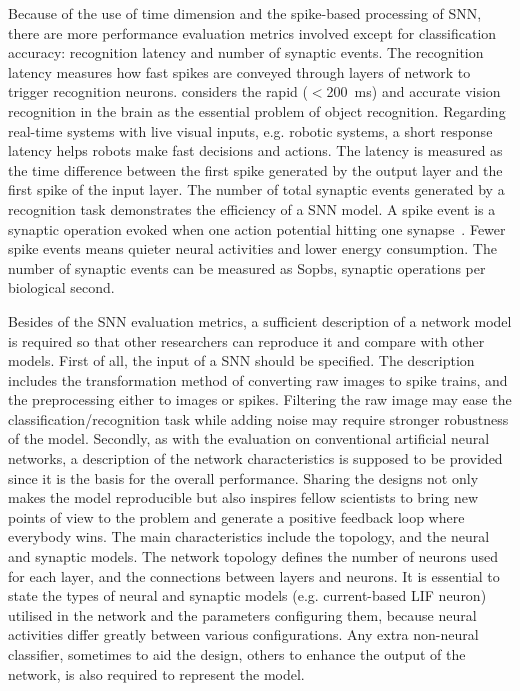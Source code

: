 \documentclass{frontiersENG} %
\begin{document}
Because of the use of time dimension and the spike-based processing of SNN, there are more performance evaluation metrics involved except for classification accuracy: recognition latency and number of synaptic events.
The recognition latency measures how fast spikes are conveyed through layers of network to trigger recognition neurons.
\cite{dicarlo2012does} considers the rapid ($<$200~ms) and accurate vision recognition in the brain as the essential problem of object recognition.
Regarding real-time systems with live visual inputs, e.g. robotic systems, a short response latency helps robots make fast decisions and actions.
The latency is measured as the time difference between the first spike generated by the output layer and the first spike of the input layer.
The number of total synaptic events generated by a recognition task demonstrates the efficiency of a SNN model.
A spike event is a synaptic operation evoked when one action potential hitting one synapse~\citep{sharp2012power}.
Fewer spike events means quieter neural activities and lower energy consumption.
The number of synaptic events can be measured as Sopbs, synaptic operations per biological second.

Besides of the SNN evaluation metrics, a sufficient description of a network model is required so that other researchers can reproduce it and compare with other models.
First of all, the input of a SNN should be specified.
The description includes the transformation method of converting raw images to spike trains, and the preprocessing either to images or spikes.
Filtering the raw image may ease the classification/recognition task while adding noise may require stronger robustness of the model.
Secondly, as with the evaluation on conventional artificial neural networks, a description of the network characteristics is supposed to be provided since it is the basis for the overall performance.
Sharing the designs not only makes the model reproducible but also inspires fellow scientists to bring new points of view to the problem and generate a positive feedback loop where everybody wins.
The main characteristics include the topology, and the neural and synaptic models.
The network topology defines the number of neurons used for each layer, and the connections between layers and neurons.
It is essential to state the types of neural and synaptic models (e.g. current-based LIF neuron) utilised in the network and the parameters configuring them, because neural activities differ greatly between various configurations.
Any extra non-neural classifier, sometimes to aid the design, others to enhance the output of the network, is also required to represent the model.
\end{document}
